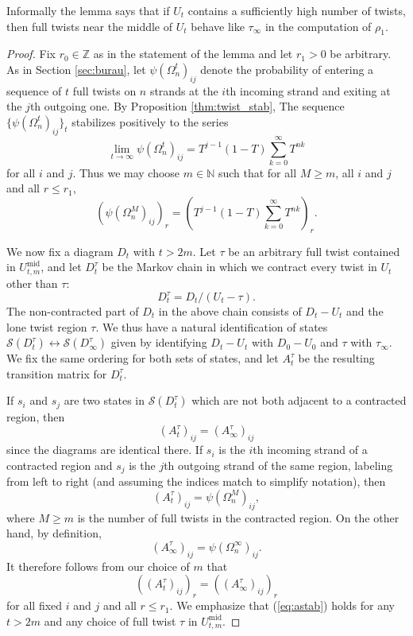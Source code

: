\documentclass[11pt,hyp,]{nyjm}
\newcommand{\Z}{\mathbb{Z}}
\newcommand{\N}{\mathbb{N}}
\numberwithin{thm}{section}
\theoremstyle{definition}
\theoremstyle{remark}
\begin{document}
	Informally the lemma says that if $U_t$ contains a sufficiently high number of twists, then full twists near the middle of $U_t$ behave like $\tau_\infty$ in the computation of $\rho_1$.
	
	\begin{proof}
		Fix $r_0 \in \Z$ as in the statement of the lemma and let $r_1 > 0$ be arbitrary. As in Section \ref{sec:burau}, let $\psi(\Omega^t_n)_{ij}$ denote the probability of entering a sequence of $t$ full twists on $n$ strands at the $i$th incoming strand and exiting at the $j$th outgoing one. By Proposition \ref{thm:twist_stab}, The sequence $\{\psi(\Omega^t_n)_{ij}\}_t$ stabilizes positively to the series
		$$
		\lim_{t \to \infty} \psi(\Omega^t_n)_{ij} = T^{j - 1}(1 - T)\sum_{k = 0}^\infty T^{nk}
		$$
		for all $i$ and $j$. Thus we may choose $m \in \N$ such that for all $M \geq m$, all $i$ and $j$ and all $r \leq r_1$,
		$$
		(\psi(\Omega^M_n)_{ij})_r = (T^{j - 1}(1 - T)\sum_{k = 0}^\infty T^{nk})_r.
		$$
		
		We now fix a diagram $D_t$ with $t > 2m$. Let $\tau$ be an arbitrary full twist contained in $U^\text{mid}_{t,m}$, and let $D^\tau_t$ be the Markov chain in which we contract every twist in $U_t$ other than $\tau$:
		$$
		D^\tau_t = D_t/(U_t - \tau).
		$$
		The non-contracted part of $D_t$ in the above chain consists of $D_t - U_t$ and the lone twist region $\tau$. We thus have a natural identification of states  $\mathcal{S}(D^\tau_t) \leftrightarrow \mathcal{S}(D^\tau_\infty)$ given by identifying $D_t - U_t$ with $D_0 - U_0$ and $\tau$ with $\tau_\infty$. We fix the same ordering for both sets of states, and let $A^\tau_t$ be the resulting transition matrix for $D^\tau_t$.
		
		If $s_i$ and $s_j$ are two states in $\mathcal{S}(D^\tau_t)$ which are not both adjacent to a contracted region, then
		$$
		(A^\tau_t)_{ij} = (A^\tau_\infty)_{ij}
		$$
		since the diagrams are identical there. If $s_i$ is the $i$th incoming strand of a contracted region and $s_j$ is the $j$th outgoing strand of the same region, labeling from left to right (and assuming the indices match to simplify notation), then
		$$
		(A^\tau_t)_{ij} = \psi(\Omega^M_n)_{ij},
		$$
		where $M \geq m$ is the number of full twists in the contracted region. On the other hand, by definition,
		$$
		(A^\tau_\infty)_{ij} = \psi(\Omega^\infty_n)_{ij}.
		$$
		It therefore follows from our choice of $m$ that
		\begin{equation}
			\label{eq:astab}
			((A^\tau_t)_{ij})_r = ((A^\tau_\infty)_{ij})_r
		\end{equation}
		for all fixed $i$ and $j$ and all $r \leq r_1$. We emphasize that (\ref{eq:astab}) holds for any $t > 2m$ and any choice of full twist $\tau$ in $U^\text{mid}_{t,m}$.
		

\end{proof}
\end{document}
